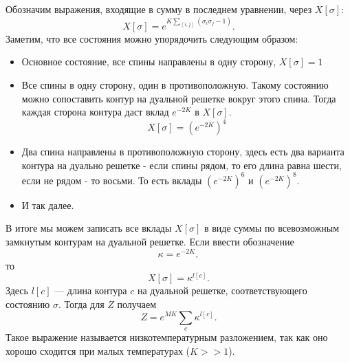 \documentclass[a4paper,12pt]{article}
\theoremstyle{definition}
\theoremstyle{definition}
\theoremstyle{definition}
\begin{document}
Обозначим выражения, входящие в сумму в последнем уравнении, через $X[\sigma]$:
\begin{equation}
  \label{eq:102}
  X[\sigma]=e^{K\sum_{\left<i,j\right>}(\sigma_i\sigma_j-1)}.
\end{equation}
Заметим, что все состояния можно упорядочить следующим образом:
\begin{itemize}
\item Основное состояние, все спины направлены в одну сторону, $X[\sigma]=1$
\item Все спины в одну сторону, один в противоположную. Такому состоянию можно сопоставить контур на дуальной решетке вокруг этого спина. Тогда каждая сторона контура даст вклад $e^{-2K}$ в $X[\sigma]$.
  \begin{equation}
    \label{eq:103}
    X[\sigma]=\left(e^{-2K}\right)^4
  \end{equation}
\item Два спина направлены в противоположную сторону, здесь есть два варианта контура на дуально решетке - если спины рядом, то его длина равна шести, если не рядом - то восьми. То есть вклады $\left(e^{-2K}\right)^6$ и $\left(e^{-2K}\right)^8$.
\item И так далее.
\end{itemize}
В итоге мы можем записать все вклады $X[\sigma]$ в виде суммы по всевозможным замкнутым контурам на дуальной решетке. Если ввести обозначение
\begin{equation}
  \label{eq:104}
  \kappa=e^{-2K},
\end{equation}
то
\begin{equation}
  \label{eq:105}
  X[\sigma]=\kappa^{l[c]}.
\end{equation}
Здесь $l[c]$ --- длина контура $c$ на дуальной решетке, соответствующего состоянию $\sigma$. Тогда для $Z$ получаем
\begin{equation}
  \label{eq:106}
  Z=e^{MK}\sum_c \kappa^{l[c]}. 
\end{equation}
Такое выражение называется низкотемпературным разложением, так как оно хорошо сходится при малых температурах ($K>>1$).
\end{document}
